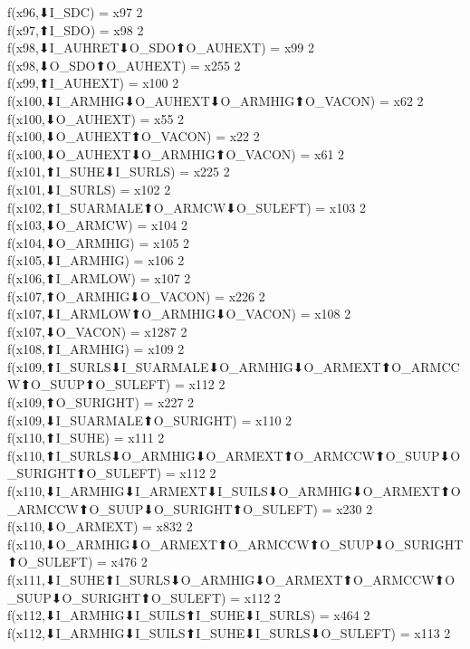 f(x96,⬇I_SDC) = x97 {2} \\
f(x97,⬆I_SDO) = x98 {2} \\
f(x98,⬇I_AUHRET⬇O_SDO⬆O_AUHEXT) = x99 {2} \\
f(x98,⬇O_SDO⬆O_AUHEXT) = x255 {2} \\
f(x99,⬆I_AUHEXT) = x100 {2} \\
f(x100,⬇I_ARMHIG⬇O_AUHEXT⬇O_ARMHIG⬆O_VACON) = x62 {2} \\
f(x100,⬇O_AUHEXT) = x55 {2} \\
f(x100,⬇O_AUHEXT⬆O_VACON) = x22 {2} \\
f(x100,⬇O_AUHEXT⬇O_ARMHIG⬆O_VACON) = x61 {2} \\
f(x101,⬆I_SUHE⬇I_SURLS) = x225 {2} \\
f(x101,⬇I_SURLS) = x102 {2} \\
f(x102,⬆I_SUARMALE⬆O_ARMCW⬇O_SULEFT) = x103 {2} \\
f(x103,⬇O_ARMCW) = x104 {2} \\
f(x104,⬇O_ARMHIG) = x105 {2} \\
f(x105,⬇I_ARMHIG) = x106 {2} \\
f(x106,⬆I_ARMLOW) = x107 {2} \\
f(x107,⬆O_ARMHIG⬇O_VACON) = x226 {2} \\
f(x107,⬇I_ARMLOW⬆O_ARMHIG⬇O_VACON) = x108 {2} \\
f(x107,⬇O_VACON) = x1287 {2} \\
f(x108,⬆I_ARMHIG) = x109 {2} \\
f(x109,⬆I_SURLS⬇I_SUARMALE⬇O_ARMHIG⬇O_ARMEXT⬆O_ARMCCW⬆O_SUUP⬆O_SULEFT) = x112 {2} \\
f(x109,⬆O_SURIGHT) = x227 {2} \\
f(x109,⬇I_SUARMALE⬆O_SURIGHT) = x110 {2} \\
f(x110,⬆I_SUHE) = x111 {2} \\
f(x110,⬆I_SURLS⬇O_ARMHIG⬇O_ARMEXT⬆O_ARMCCW⬆O_SUUP⬇O_SURIGHT⬆O_SULEFT) = x112 {2} \\
f(x110,⬇I_ARMHIG⬇I_ARMEXT⬇I_SUILS⬇O_ARMHIG⬇O_ARMEXT⬆O_ARMCCW⬆O_SUUP⬇O_SURIGHT⬆O_SULEFT) = x230 {2} \\
f(x110,⬇O_ARMEXT) = x832 {2} \\
f(x110,⬇O_ARMHIG⬇O_ARMEXT⬆O_ARMCCW⬆O_SUUP⬇O_SURIGHT⬆O_SULEFT) = x476 {2} \\
f(x111,⬇I_SUHE⬆I_SURLS⬇O_ARMHIG⬇O_ARMEXT⬆O_ARMCCW⬆O_SUUP⬇O_SURIGHT⬆O_SULEFT) = x112 {2} \\
f(x112,⬇I_ARMHIG⬇I_SUILS⬆I_SUHE⬇I_SURLS) = x464 {2} \\
f(x112,⬇I_ARMHIG⬇I_SUILS⬆I_SUHE⬇I_SURLS⬇O_SULEFT) = x113 {2} \\
